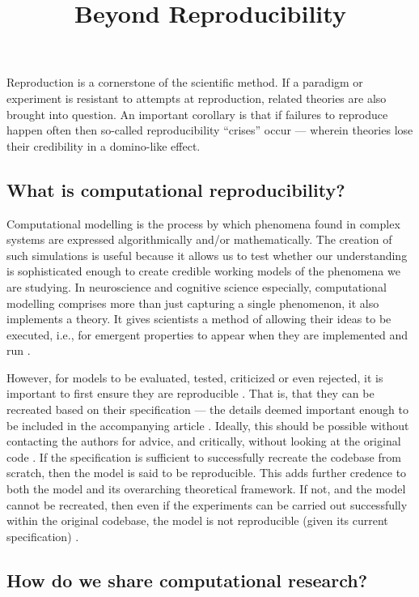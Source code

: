 \documentclass[jou]{apa6}
\title{Beyond Reproducibility}
\begin{document}
\maketitle

Reproduction is a cornerstone of the scientific method.
If a paradigm or experiment is resistant to attempts at reproduction, related theories are also brought into question.
An important corollary is that if failures to reproduce happen often then so-called reproducibility ``crises'' occur --- wherein theories lose their credibility in a domino-like effect.

\subsection*{What is computational reproducibility?}

Computational modelling is the process by which phenomena found in complex systems are expressed algorithmically and/or mathematically.
The creation of such simulations is useful because it allows us to test whether our understanding is sophisticated enough to create credible working models of the phenomena we are studying.
In neuroscience and cognitive science especially, computational modelling comprises more than just capturing a single phenomenon, it also  implements a theory.
It gives scientists a method of allowing their ideas to be executed, i.e., for emergent properties to appear when they are implemented and run \cite{mcclelland09}.

However, for models to be evaluated, tested, criticized or even rejected, it is important to first ensure they are reproducible \cite{topalidou15}.  
That is, that they can be recreated based on their specification --- the details deemed important enough to be included in the accompanying article \cite{hinsen15}.
Ideally, this should be possible without contacting the authors for advice, and critically, without looking at the original code \cite{cooper14}.
If the specification is sufficient to successfully recreate the codebase from scratch, then the model is said to be reproducible.
This adds further credence to both the model and its overarching theoretical framework.
If not, and the model cannot be recreated, then even if the experiments can be carried out successfully within the original codebase, the model is not reproducible (given its current specification) \cite{crook13}.


\subsection*{How do we share computational research?}
\end{document}
